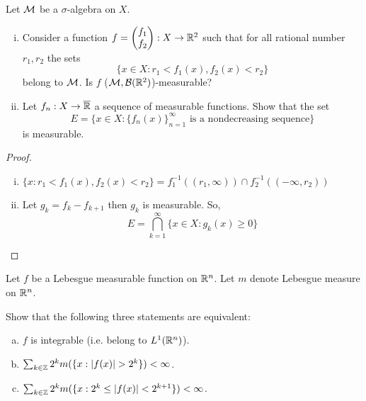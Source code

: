 \begin{problem}
  Let $\mathcal M$ be a $\sigma$-algebra on $X$.
  \begin{enumerate}[(i)]
    \item Consider a function $f = \begin{pmatrix}
      f_1\\
      f_2
    \end{pmatrix} : X \to \mathbb R^2$ such that for all rational number $r_1, r_2$ the sets
    \[\{x \in X : r_1 < f_1(x), f_2(x) < r_2\}\]
    belong to $\mathcal M$. Is $f$ ($\mathcal M, \mathcal{B}(\mathbb R^2)$)-measurable?
    \item Let $f_n : X \to \overline{\mathbb R}$ a sequence of measurable functions. Show that the set
    \[E = \{x \in X : \{f_n(x)\}_{n=1}^\infty \text{ is a nondecreasing sequence}\}\]
    is measurable.
  \end{enumerate} 
\end{problem}

\begin{proof}
  \begin{enumerate}[(i)]
    \item $\{x : r_1 < f_1(x), f_2(x) < r_2\} = f_1^{-1}((r_1, \infty)) \cap f_2^{-1}((-\infty, r_2))$
    \item Let $g_k = f_k - f_{k+1}$ then $g_k$ is measurable. So,
    \[E = \bigcap_{k=1}^\infty \{x \in X : g_k(x) \ge 0 \}\]
  \end{enumerate}
\end{proof}

\begin{problem}
  Let $f$ be a Lebesgue measurable function on $\mathbb R^n$. Let $m$ denote Lebesgue measure on $\mathbb R^n$.

  Show that the following  three statements are equivalent:
  \begin{enumerate}[(a)]
    \item $f$ is integrable (i.e. belong to $L^1(\mathbb R^n)$).
    \item $\sum_{k \in \mathbb Z} 2^km(\{x : |f(x)| > 2^k\}) < \infty$.
    \item $\sum_{k \in \mathbb Z} 2^km(\{x : 2^k \le |f(x)| < 2^{k+1}\}) < \infty$.
  \end{enumerate}
\end{problem}

